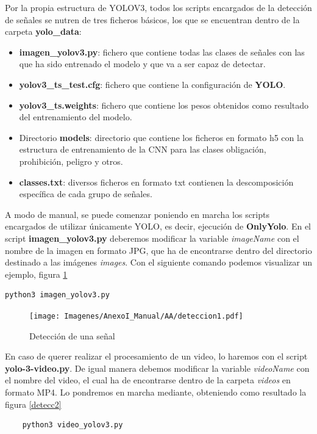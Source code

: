 Por la propia estructura de YOLOV3, todos los scripts encargados de la detección de señales se nutren de tres ficheros básicos, los que se encuentran dentro de la carpeta \textbf{yolo_data}:
\begin{itemize}
\item \textbf{imagen_yolov3.py}: fichero que contiene todas las clases de señales con las que ha sido entrenado el modelo y que va a ser capaz de detectar.
\item \textbf{yolov3_ts_test.cfg}: fichero que contiene la configuración de \textbf{YOLO}.
\item \textbf{yolov3_ts.weights}: fichero que contiene los pesos obtenidos como resultado del entrenamiento del modelo.
\item Directorio \textbf{models}: directorio que contiene los ficheros en formato h5 con la estructura de entrenamiento de la CNN para las clases obligación, prohibición, peligro y otros.
\item \textbf{classes.txt}: diversos ficheros en formato txt contienen la descomposición específica de cada grupo de señales.
\end{itemize}

A modo de manual, se puede comenzar poniendo en marcha los scripts encargados de utilizar únicamente YOLO, es decir, ejecución de \textbf{OnlyYolo}. En el script \textbf{imagen_yolov3.py} deberemos modificar la variable \textit{imageName} con el nombre de la imagen en formato JPG, que ha de encontrarse dentro del directorio destinado a las imágenes \textit{images}. Con el siguiente comando podemos visualizar un ejemplo, figura \ref{detecc1} 

\begin{lstlisting}
python3 imagen_yolov3.py
\end{lstlisting}

\begin{figure}[H]
	\centering
	\texttt{[image: Imagenes/AnexoI\_Manual/AA/deteccion1.pdf]}
	\caption{Detección de una señal}
	\label{detecc1}
\end{figure}

En caso de querer realizar el procesamiento de un video, lo haremos con el script \textbf{yolo-3-video.py}. De igual manera debemos modificar la variable \textit{videoName} con el nombre del video, el cual ha de encontrarse dentro de la carpeta \textit{videos} en formato MP4. Lo pondremos en marcha mediante, obteniendo como resultado la figura \ref{detecc2}
\begin{lstlisting}
	python3 video_yolov3.py
\end{lstlisting}
	
